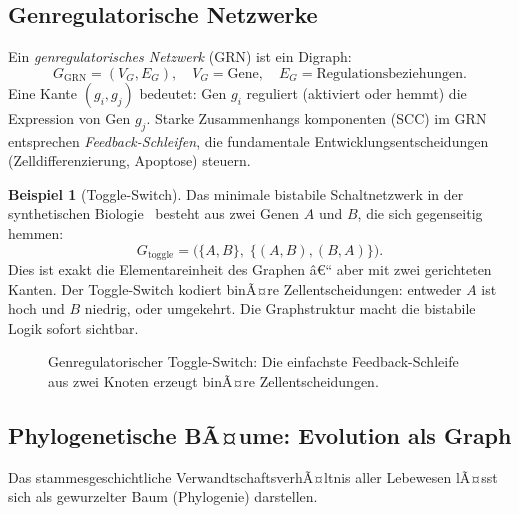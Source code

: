 ﻿\documentclass[12pt,a4paper,twoside]{article}
\theoremstyle{definition}
\newtheorem{beispiel}{Beispiel}[section]
\theoremstyle{plain}
\theoremstyle{remark}
\begin{document}
\subsection{Genregulatorische Netzwerke}

Ein \emph{genregulatorisches Netzwerk} (GRN) ist ein Digraph:
\[
  G_{\text{GRN}} = (V_G, E_G), \quad
  V_G = \text{Gene}, \quad
  E_G = \text{Regulationsbeziehungen}.
\]
Eine Kante $(g_i, g_j)$ bedeutet: Gen $g_i$ reguliert (aktiviert
oder hemmt) die Expression von Gen $g_j$.  Starke Zusammenhangs\-
komponenten (SCC) im GRN entsprechen \emph{Feedback-Schleifen},
die fundamentale Entwicklungsentscheidungen (Zelldifferenzierung,
Apoptose) steuern.

\begin{beispiel}[Toggle-Switch]
Das minimale bistabile Schaltnetzwerk in der synthetischen
Biologie~\cite{Gardner2000} besteht aus zwei Genen $A$ und $B$,
die sich gegenseitig hemmen:
\[
  G_{\text{toggle}} = \bigl(\{A,B\},\; \{(A,B),(B,A)\}\bigr).
\]
Dies ist exakt die Elementareinheit des Graphen â€“ aber mit zwei
gerichteten Kanten.  Der Toggle-Switch kodiert binÃ¤re
Zellentscheidungen: entweder $A$ ist hoch und $B$ niedrig,
oder umgekehrt.  Die Graphstruktur macht die bistabile Logik
sofort sichtbar.
\end{beispiel}

\begin{figure}[h]
  \centering
  \caption{Genregulatorischer Toggle-Switch:  Die einfachste
           Feedback-Schleife aus zwei Knoten erzeugt binÃ¤re
           Zellentscheidungen.}
  \label{fig:toggle}
\end{figure}

\subsection{Phylogenetische BÃ¤ume: Evolution als Graph}

Das stammesgeschichtliche VerwandtschaftsverhÃ¤ltnis aller
Lebewesen lÃ¤sst sich als gewurzelter Baum (Phylogenie) darstellen.
\end{document}
